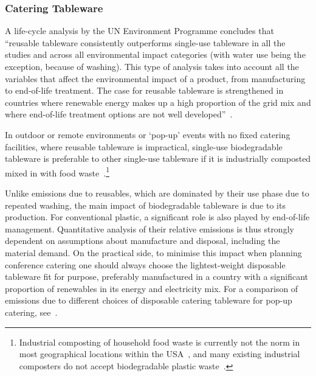 \documentclass[../SustainableHEP.tex]{subfiles}
\begin{document}
\subsubsection{Catering Tableware}
\label{sec:CateringTableware}
A life-cycle analysis by the UN Environment Programme concludes that ``reusable tableware consistently outperforms single-use tableware in all the studies and across all environmental impact categories (with water use being the exception, because of washing). This type of analysis takes into account all the variables that affect the environmental impact of a product, from manufacturing to end-of-life treatment. The case for reusable tableware is strengthened in countries where renewable energy makes up a high proportion of the grid mix and where end-of-life treatment options are not well developed''~\cite{UNEP2021}. 

In outdoor or remote environments or ‘pop-up’ events with no fixed catering facilities, where reusable tableware is impractical, single-use biodegradable tableware is preferable to other single-use tableware if it is industrially composted mixed in with food waste~\cite{UNEP2021}.\footnote{Industrial composting of household food waste is currently not the norm in most geographical locations within the USA~\cite{EPAWasteFoodMgmt}, and many existing industrial composters do not accept biodegradable plastic waste~\cite{BioplasticsAtIndustrialSites}.} 

Unlike emissions due to reusables, which are dominated by their use phase due to repeated washing, the  main impact of biodegradable tableware is due to its production. For conventional plastic, a significant role is also played by end-of-life management.  Quantitative analysis of their relative emissions is thus strongly dependent on assumptions about manufacture and disposal, including the material demand.  On the practical side, to minimise this impact when planning conference catering one should always choose the lightest-weight disposable tableware fit for purpose, preferably manufactured in a country with a significant proportion of renewables in its energy and electricity mix.  For a comparison of emissions due to different choices of disposable catering tableware for pop-up catering, see~.
\end{document}
